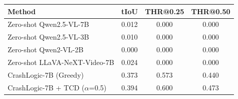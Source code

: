 \begin{tabular}{lccc}
\toprule
Method & tIoU & THR@0.25 & THR@0.50 \\
\midrule
Zero-shot Qwen2.5-VL-7B & 0.012 & 0.000 & 0.000 \\
Zero-shot Qwen2.5-VL-3B & 0.010 & 0.000 & 0.000 \\
Zero-shot Qwen2-VL-2B & 0.000 & 0.000 & 0.000 \\
Zero-shot LLaVA-NeXT-Video-7B & 0.024 & 0.000 & 0.000 \\
CrashLogic-7B (Greedy) & 0.373 & 0.573 & 0.440 \\
CrashLogic-7B + TCD ($\alpha$=0.5) & 0.394 & 0.600 & 0.473 \\
\bottomrule
\end{tabular}
